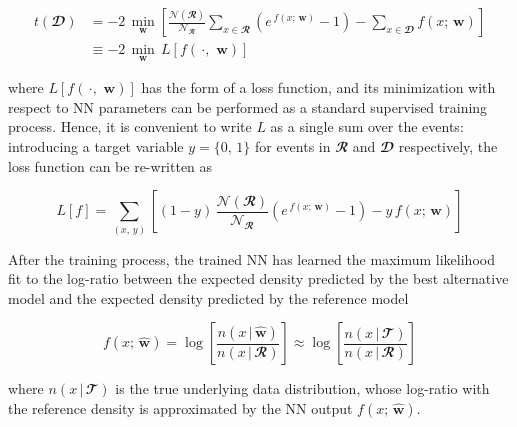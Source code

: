 \begin{align}
    t(\mathbfcal{D}) & = 
    -2\,\min_{\mathbf{w}} 
    \left[
        \frac{
            \mathcal{N}(\mathbfcal{R})
        }{
            \mathcal{N}_{\mathbfcal{R}}
        }
        \sum_{x \in \mathbfcal{R}}
        \left(
            e^{\,f(x;\,\mathbf{w})} - 1
        \right)
        - \sum_{x \in \mathbfcal{D}}  f(x;\,\mathbf{w})
    \right] \\
    & \equiv -2\,\min_{\mathbf{w}} \, L
    \left[
        f(\,\cdot,\,\,\mathbf{w})
    \right]\label{eq:testd}
\end{align}

\noindent where $L\left[f(\,\cdot,\,\,\mathbf{w})\right]$ has the form of a loss function, and its minimization with
respect to NN parameters can be performed as a standard supervised training process. Hence, it is convenient to write
$L$ as a single sum over the events: introducing a target variable $y=\{0,\,1\}$ for events in $\mathbfcal{R}$ and
$\mathbfcal{D}$ respectively, the loss function can be re-written as

\begin{equation}\label{eq:loss}
    L[f]=\sum_{(x,\,y)}
    \left[
        (1-y)\,
        \frac{
            \mathcal{N}(\mathbfcal{R})
        }{
            \mathcal{N}_{\mathbfcal{R}}
        }
        \left(
            e^{\,f(x;\,\mathbf{w})} - 1
        \right)
        -y\,f(x;\,\mathbf{w})
    \right]
\end{equation}

\noindent After the training process, the trained NN has learned the maximum likelihood fit to the log-ratio between
the expected density predicted by the best alternative model and the expected density predicted by the reference model

\begin{equation}\label{eq:output}
    f(x;\,\widehat{\mathbf{w}}) = 
    \log
    \left[
        \frac{
            n(x\,|\,\widehat{\mathbf{w}})
        }{
            n(x\,|\,\mathbfcal{R})
        }
    \right]
    \approx
    \log
    \left[
        \frac{
            n(x\,|\,\mathbfcal{T})
        }{
            n(x\,|\,\mathbfcal{R})
        }
    \right]
\end{equation}

\noindent where $n(x\,|\,\mathbfcal{T})$ is the true underlying data distribution, whose log-ratio with the reference
density is approximated by the NN output $f(x;\,\widehat{\mathbf{w}})$.


